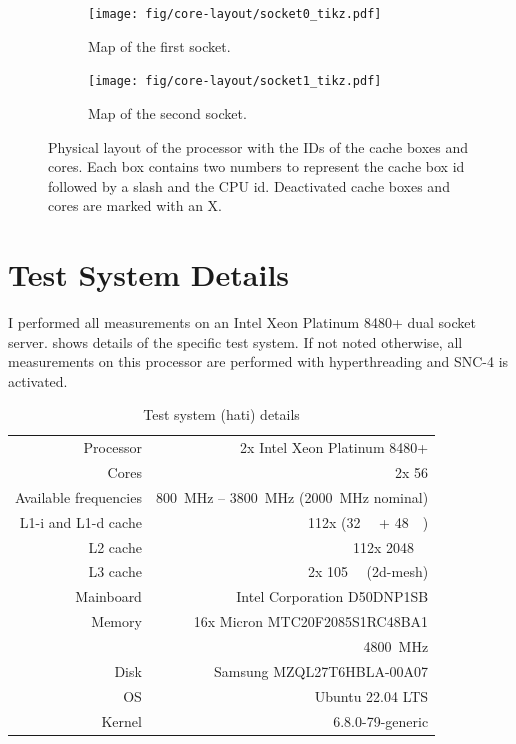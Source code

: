 \begin{figure}[]
    \begin{subfigure}[t]{0.45\linewidth}
        \centering
        \texttt{[image: fig/core-layout/socket0\_tikz.pdf]}
        \caption{Map of the first socket.}
    \end{subfigure}
    \hfill
    \begin{subfigure}[t]{0.45\linewidth}
        \centering
        \texttt{[image: fig/core-layout/socket1\_tikz.pdf]}
        \caption{Map of the second socket.}
    \end{subfigure}
    \caption{\label{fig:physical-layout}Physical layout of the processor with the IDs of the cache boxes and cores.
	Each box contains two numbers to represent the cache box id followed by a slash and the CPU id.
	Deactivated cache boxes and cores are marked with an X.}
\end{figure}

\section{Test System Details}
I performed all measurements on an Intel Xeon Platinum 8480+ dual socket server.
 shows details of the specific test system.
If not noted otherwise, all measurements on this processor are performed with hyperthreading and SNC-4 is activated.

\begin{table}[t]
	\centering
	\caption{\label{tab:test-system}Test system (hati) details}
	\begin{tabular}{rr}
		\toprule
		Processor	&	2x Intel Xeon Platinum 8480+ \\
		\rowcolor[HTML]{EFEFEF}Cores		&	2x 56 \\
		Available frequencies	&	\SI{800}{\MHz} -- \SI{3800}{\MHz} (\SI{2000}{\MHz} nominal) \\
		\rowcolor[HTML]{EFEFEF}L1-i and L1-d cache	&	112x (\SI{32}{\kibi\byte} + \SI{48}{\kibi\byte})\\
		L2 cache	&	112x \SI{2048}{\kibi\byte} \\
		\rowcolor[HTML]{EFEFEF}L3 cache	&	2x \SI{105}{\mebi\byte} (2d-mesh) \\
		Mainboard	&	Intel Corporation D50DNP1SB \\
		\rowcolor[HTML]{EFEFEF}Memory		&	16x Micron MTC20F2085S1RC48BA1  \\
		\rowcolor[HTML]{EFEFEF}&	\SI{4800}{\mega\hertz} \\
		Disk		&	Samsung MZQL27T6HBLA-00A07 \\
		\rowcolor[HTML]{EFEFEF}OS           &   Ubuntu 22.04 LTS \\
		Kernel          &   6.8.0-79-generic \\
		\bottomrule
	\end{tabular}
\end{table}


